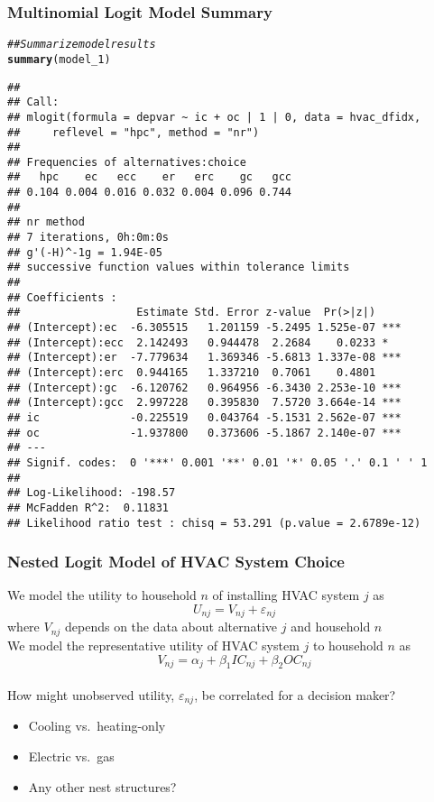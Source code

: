 \documentclass{beamer}\usepackage[]{graphicx}\usepackage[]{color}
\makeatletter
\newcommand{\hlcom}[1]{\textcolor[rgb]{0.678,0.584,0.686}{\textit{#1}}}%
\newcommand{\hlstd}[1]{\textcolor[rgb]{0.345,0.345,0.345}{#1}}%
\newcommand{\hlkwd}[1]{\textcolor[rgb]{0.737,0.353,0.396}{\textbf{#1}}}%
\newenvironment{kframe}{%
 \def\at@end@of@kframe{}%
 \ifinner\ifhmode%
  \def\at@end@of@kframe{\end{minipage}}%
  \begin{minipage}{\columnwidth}%
 \fi\fi%
 \def\FrameCommand##1{\hskip\@totalleftmargin \hskip-\fboxsep
 \colorbox{shadecolor}{##1}\hskip-\fboxsep
     \hskip-\linewidth \hskip-\@totalleftmargin \hskip\columnwidth}%
 \MakeFramed {\advance\hsize-\width
   \@totalleftmargin\z@ \linewidth\hsize
   \@setminipage}}%
 {\par\unskip\endMakeFramed%
 \at@end@of@kframe}
\newenvironment{knitrout}{}{} %
\makeatother
\begin{document}
\begin{frame}[fragile]\frametitle{Multinomial Logit Model Summary}
\begin{knitrout}\tiny
{}\color{fgcolor}\begin{kframe}
\begin{alltt}
\hlcom{## Summarize model results}
\hlkwd{summary}\hlstd{(model_1)}
\end{alltt}
\begin{verbatim}
## 
## Call:
## mlogit(formula = depvar ~ ic + oc | 1 | 0, data = hvac_dfidx, 
##     reflevel = "hpc", method = "nr")
## 
## Frequencies of alternatives:choice
##   hpc    ec   ecc    er   erc    gc   gcc 
## 0.104 0.004 0.016 0.032 0.004 0.096 0.744 
## 
## nr method
## 7 iterations, 0h:0m:0s 
## g'(-H)^-1g = 1.94E-05 
## successive function values within tolerance limits 
## 
## Coefficients :
##                  Estimate Std. Error z-value  Pr(>|z|)    
## (Intercept):ec  -6.305515   1.201159 -5.2495 1.525e-07 ***
## (Intercept):ecc  2.142493   0.944478  2.2684    0.0233 *  
## (Intercept):er  -7.779634   1.369346 -5.6813 1.337e-08 ***
## (Intercept):erc  0.944165   1.337210  0.7061    0.4801    
## (Intercept):gc  -6.120762   0.964956 -6.3430 2.253e-10 ***
## (Intercept):gcc  2.997228   0.395830  7.5720 3.664e-14 ***
## ic              -0.225519   0.043764 -5.1531 2.562e-07 ***
## oc              -1.937800   0.373606 -5.1867 2.140e-07 ***
## ---
## Signif. codes:  0 '***' 0.001 '**' 0.01 '*' 0.05 '.' 0.1 ' ' 1
## 
## Log-Likelihood: -198.57
## McFadden R^2:  0.11831 
## Likelihood ratio test : chisq = 53.291 (p.value = 2.6789e-12)
\end{verbatim}
\end{kframe}
\end{knitrout}
\end{frame}

\begin{frame}\frametitle{Nested Logit Model of HVAC System Choice}
    We model the utility to household $n$ of installing HVAC system $j$ as
    $$U_{nj} = V_{nj} + \varepsilon_{nj}$$
    where $V_{nj}$ depends on the data about alternative $j$ and household $n$ \\
    \vspace{3ex}
    We model the representative utility of HVAC system $j$ to household $n$ as
    $$V_{nj} = \alpha_j + \beta_1 IC_{nj} + \beta_2 OC_{nj}$$ \\
    \vspace{2ex}
    How might unobserved utility, $\varepsilon_{nj}$, be correlated for a decision maker?
    \begin{itemize}
    	\item Cooling vs.\ heating-only
    	\item Electric vs.\ gas
    	\item Any other nest structures?
    \end{itemize}
\end{frame}
\end{document}
